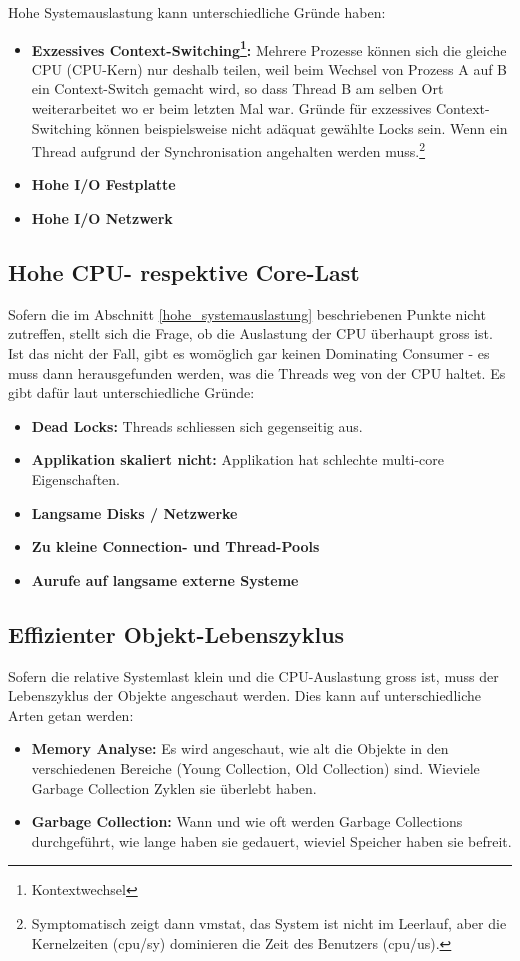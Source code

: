 Hohe Systemauslastung kann unterschiedliche Gründe haben: 
\begin{itemize}
\item \textbf{Exzessives Context-Switching\footnote{Kontextwechsel}:} Mehrere Prozesse können sich die gleiche CPU (CPU-Kern) nur deshalb teilen, weil beim Wechsel von Prozess A auf B ein Context-Switch gemacht wird, so dass Thread B am selben Ort weiterarbeitet wo er beim letzten Mal war. Gründe für exzessives Context-Switching können beispielsweise nicht adäquat gewählte Locks sein. Wenn ein Thread aufgrund der Synchronisation angehalten werden muss.\footnote{Symptomatisch zeigt dann vmstat, das System ist nicht im Leerlauf, aber die Kernelzeiten (cpu/sy) dominieren die Zeit des Benutzers (cpu/us).}
\item \textbf{Hohe I/O Festplatte} 
\item \textbf{Hohe I/O Netzwerk} 
\end{itemize}


\subsection{Hohe CPU- respektive Core-Last}
Sofern die im Abschnitt \ref{hohe_systemauslastung} beschriebenen Punkte nicht zutreffen, stellt sich die Frage, ob die Auslastung der CPU überhaupt gross ist. Ist das nicht der Fall, gibt es womöglich gar keinen Dominating Consumer - es muss dann herausgefunden werden, was die Threads weg von der CPU haltet. Es gibt dafür laut \cite{pepperdine201102} unterschiedliche Gründe:
\begin{itemize}
\item \textbf{Dead Locks: } Threads schliessen sich gegenseitig aus. 
\item \textbf{Applikation skaliert nicht: } Applikation hat schlechte multi-core Eigenschaften.
\item \textbf{Langsame Disks / Netzwerke}
\item \textbf{Zu kleine Connection- und Thread-Pools}
\item \textbf{Aurufe auf langsame externe Systeme}
\end{itemize}


\subsection{Effizienter Objekt-Lebenszyklus}
Sofern die relative Systemlast klein und die CPU-Auslastung gross ist, muss der Lebenszyklus der Objekte angeschaut werden. Dies kann auf unterschiedliche Arten getan werden:
\begin{itemize}
\item \textbf{Memory Analyse: }Es wird angeschaut, wie alt die Objekte in den verschiedenen Bereiche (Young Collection, Old Collection) sind. Wieviele Garbage Collection Zyklen sie überlebt haben.
\item \textbf{Garbage Collection: }Wann und wie oft werden Garbage Collections durchgeführt, wie lange haben sie gedauert, wieviel Speicher haben sie befreit.
\end{itemize}

